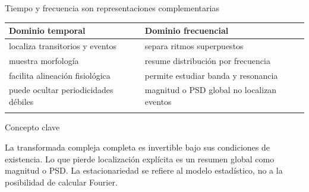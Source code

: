 \documentclass[
  10pt,
  ignorenonframetext,
  aspectratio=169,
  spanish,
]{beamer}
\begin{document}
\begin{frame}{Tiempo y frecuencia son representaciones complementarias}
\label{d1-075}
\begin{longtable}[]{@{}
  >{\raggedright\arraybackslash}p{}
  >{\raggedright\arraybackslash}p{}@{}}
\toprule\noalign{}
\begin{minipage}[b]{\linewidth}\raggedright
Dominio temporal
\end{minipage} & \begin{minipage}[b]{\linewidth}\raggedright
Dominio frecuencial
\end{minipage} \\
\midrule\noalign{}
\endhead
localiza transitorios y eventos & separa ritmos superpuestos \\
muestra morfología & resume distribución por frecuencia \\
facilita alineación fisiológica & permite estudiar banda y resonancia \\
puede ocultar periodicidades débiles & magnitud o PSD global no
localizan eventos \\
\bottomrule\noalign{}
\end{longtable}

\begin{block}{Concepto clave}

La transformada compleja completa es invertible bajo sus condiciones de
existencia. Lo que pierde localización explícita es un resumen global
como magnitud o PSD. La estacionariedad se refiere al modelo
estadístico, no a la posibilidad de calcular Fourier.

\end{block}

\end{frame}
\end{document}
